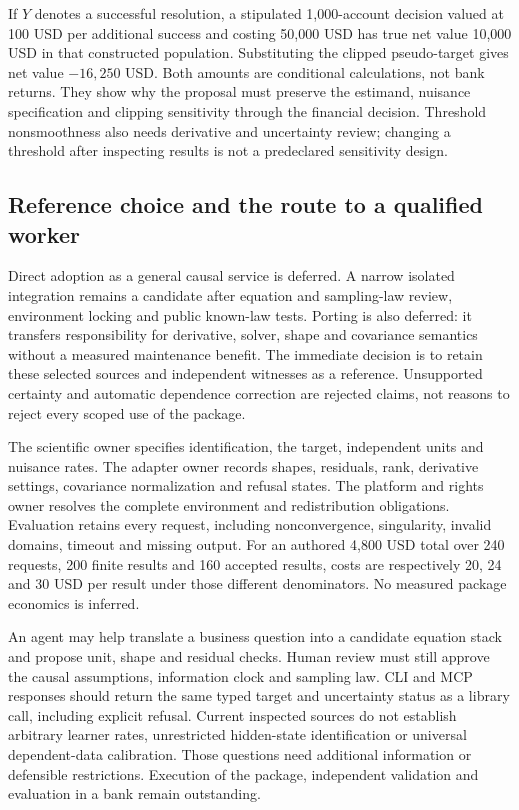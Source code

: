 If $Y$ denotes a successful resolution, a stipulated 1,000-account
decision valued at 100 USD per additional success and costing 50,000 USD
has true net value 10,000 USD in that constructed population. Substituting
the clipped pseudo-target gives net value $-16,250$ USD. Both amounts are
conditional calculations, not bank returns. They show why the proposal
must preserve the estimand, nuisance specification and clipping sensitivity
through the financial decision. Threshold nonsmoothness also needs
derivative and uncertainty review; changing a threshold after inspecting
results is not a predeclared sensitivity design.
\citep{exec24_delicatessen_choice}

\subsection{Reference choice and the route to a qualified worker}
Direct adoption as a general causal service is deferred. A narrow isolated
integration remains a candidate after equation and sampling-law review,
environment locking and public known-law tests. Porting is also deferred:
it transfers responsibility for derivative, solver, shape and covariance
semantics without a measured maintenance benefit. The immediate decision
is to retain these selected sources and independent witnesses as a
reference. Unsupported certainty and automatic dependence correction are
rejected claims, not reasons to reject every scoped use of the package.
\citep{exec24_delicatessen_choice}

The scientific owner specifies identification, the target, independent
units and nuisance rates. The adapter owner records shapes, residuals,
rank, derivative settings, covariance normalization and refusal states.
The platform and rights owner resolves the complete environment and
redistribution obligations. Evaluation retains every request, including
nonconvergence, singularity, invalid domains, timeout and missing output.
For an authored 4,800 USD total over 240 requests, 200 finite results and
160 accepted results, costs are respectively 20, 24 and 30 USD per result
under those different denominators. No measured package economics is
inferred.~\citep{exec24_delicatessen_choice}

An agent may help translate a business question into a candidate equation
stack and propose unit, shape and residual checks. Human review must still
approve the causal assumptions, information clock and sampling law. CLI
and MCP responses should return the same typed target and uncertainty
status as a library call, including explicit refusal. Current inspected
sources do not establish arbitrary learner rates, unrestricted hidden-state
identification or universal dependent-data calibration. Those questions
need additional information or defensible restrictions. Execution of the package, independent validation and evaluation in a bank remain outstanding.
\citep{exec24_delicatessen_choice}


